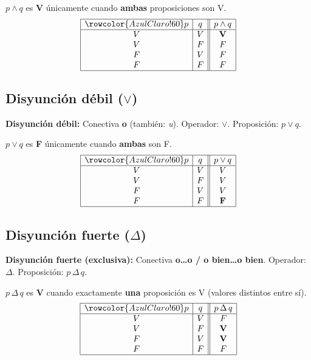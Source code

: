 	\begin{cajaprop}[Conjunción]
		$p \wedge q$ es \textbf{V} únicamente cuando \textbf{ambas} proposiciones son V.
		\[
		\begin{array}{|c|c||c|}
			\hline
			\rowcolor{AzulClaro!60}
			p & q & p \wedge q \\
			\hline
			V & V & \mathbf{V} \\
			V & F & F \\
			F & V & F \\
			F & F & F \\
			\hline
		\end{array}
		\]
	\end{cajaprop}
	
	\subsection{Disyunción débil ($\vee$)}
	
	\begin{cajadef}
		\textbf{Disyunción débil:} Conectiva \textbf{o} (también: \textit{u}).
		Operador: $\vee$. Proposición: $p \vee q$.
	\end{cajadef}
	
	\begin{cajaprop}
		$p \vee q$ es \textbf{F} únicamente cuando \textbf{ambas} son F.
		\[
		\begin{array}{|c|c||c|}
			\hline
			\rowcolor{AzulClaro!60}
			p & q & p \vee q \\
			\hline
			V & V & V \\
			V & F & V \\
			F & V & V \\
			F & F & \mathbf{F} \\
			\hline
		\end{array}
		\]
	\end{cajaprop}
	
	\subsection{Disyunción fuerte ($\Delta$)}
	
	\begin{cajadef}
		\textbf{Disyunción fuerte (exclusiva):} Conectiva \textbf{o\ldots o / o
			bien\ldots o bien}. Operador: $\Delta$. Proposición: $p \,\Delta\, q$.
	\end{cajadef}
	
	\begin{cajaprop}
		$p \,\Delta\, q$ es \textbf{V} cuando exactamente \textbf{una} proposición
		es V (valores distintos entre sí).
		\[
		\begin{array}{|c|c||c|}
			\hline
			\rowcolor{AzulClaro!60}
			p & q & p \,\Delta\, q \\
			\hline
			V & V & F \\
			V & F & \mathbf{V} \\
			F & V & \mathbf{V} \\
			F & F & F \\
			\hline
		\end{array}
		\]
	\end{cajaprop}
	
